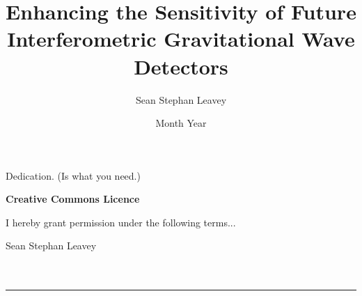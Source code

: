 \documentclass[twoside,nogutter]{glasgowthesis}
\begin{document}

\title{Enhancing the Sensitivity of Future Interferometric Gravitational Wave Detectors}
\author{Sean Stephan Leavey}
\date{Month Year}

\maketitle

\cleardoublepage



\newpage


\cleardoublepage
\vspace*{1.75in}
\begin{flushright} Dedication. (Is what you need.)\end{flushright}



\newpage

\vspace*{1.75in}
\begin{center} {\bf Creative Commons Licence}\end{center}
\noindent I hereby grant permission under the following terms...

\begin{description}
\item Sean Stephan Leavey\ \\ \ \\ \ \\
\hrule
\end{description}
\newpage


 

\newpage
\tableofcontents
\listoftables
\listoffigures

\printglossaries

\cleardoublepage
\end{document}
